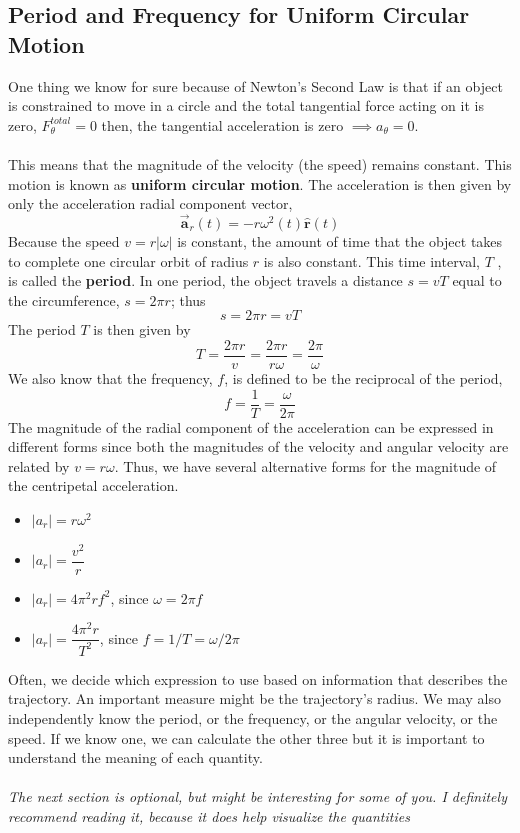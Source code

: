 \documentclass[12pt,addpoints]{exam}
\begin{document}
	\subsection*{Period and Frequency for Uniform Circular Motion}
	One thing we know for sure because of Newton's Second Law is that if an object is constrained to move in a circle and the total tangential force acting on it is zero,  $F^{total}_\theta=0$ then, the tangential acceleration is zero $\implies a_{\theta}=0$. \\ \\
	This means that the magnitude of the velocity (the speed) remains constant. This motion is known as \textbf{uniform circular motion}. The acceleration is then given by only the acceleration radial component vector,
	$$\overrightarrow{\mathbf{a}}_{r}(t)=-r \omega^{2}(t) \hat{\mathbf{r}}(t)$$
	Because the speed $v=r|\omega|$ is constant, the amount of time that the object takes to complete one circular orbit of radius $r$ is also constant. This time interval, $T$ , is called the \textbf{period}. In one period, the object travels a distance $s = vT$ equal to the circumference, $s=2\pi r$; thus
	$$s=2 \pi r=v T$$
	The period $T$ is then given by
	$$T=\frac{2 \pi r}{v}=\frac{2 \pi r}{r \omega}=\frac{2 \pi}{\omega}$$
	We also know that the frequency, $f$, is defined to be the reciprocal of the period,
	$$f=\frac{1}{T}=\frac{\omega}{2 \pi} $$
	The magnitude of the radial component of the acceleration can be expressed in different forms since both the magnitudes of the velocity and angular velocity are related by $v = r\omega$. Thus, we have several alternative forms for the magnitude of the centripetal acceleration. 
	\begin{itemize}
		\item $\left|a_{r}\right|=r \omega^{2}$
		\item $\left|a_{r}\right|=\dfrac{v^{2}}{r}$
		\item $\left|a_{r}\right|=4 \pi^{2} r f^{2}$, since $\omega=2\pi f$
		\item $\left|a_{r}\right|=\dfrac{4 \pi^{2} r}{T^{2}}$, since $f=1 / T=\omega / 2 \pi$
	\end{itemize}
	Often, we decide which expression to use based on information that describes the trajectory. An important measure might be the trajectory’s radius. We may also independently know the period, or the frequency, or the angular velocity, or the speed. If we know one, we can calculate the other three but it is important to understand the meaning of each quantity. \\ \\
	\textit{The next section is optional, but might be interesting for some of you. I definitely recommend reading it, because it does help visualize the quantities}
\end{document}
